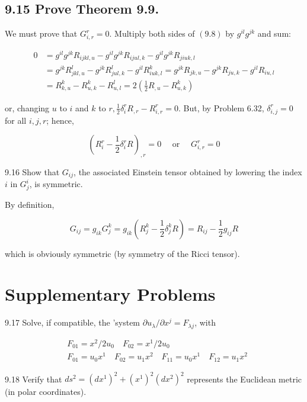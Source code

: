 \documentclass[10pt]{article}
\begin{document}
\subsection*{9.15 Prove Theorem 9.9.}
We must prove that $G_{i, r}^{r}=0$. Multiply both sides of $(9.8)$ by $g^{i l} g^{j k}$ and sum:

$$
\begin{aligned}
0 & =g^{i l} g^{j k} R_{i j k l, u}-g^{i l} g^{j k} R_{i j u l, k}-g^{i l} g^{j k} R_{j i u k, l} \\
& =g^{j k} R_{j k l, u}^{l}-g^{j k} R_{j u l, k}^{l}-g^{i l} R_{i u k, l}^{k}=g^{j k} R_{j k, u}-g^{j k} R_{j u, k}-g^{i l} R_{i u, l} \\
& =R_{k, u}^{k}-R_{u, k}^{k}-R_{u, l}^{l}=2\left(\frac{1}{2} R_{, u}-R_{u, k}^{k}\right)
\end{aligned}
$$

or, changing $u$ to $i$ and $k$ to $r, \frac{1}{2} \delta_{i}^{r} R_{, r}-R_{i, r}^{r}=0$. But, by Problem 6.32, $\delta_{i, j}^{r}=0$ for all $i, j, r$; hence,

$$
\left(R_{i}^{r}-\frac{1}{2} \delta_{i}^{r} R\right)_{, r}=0 \quad \text { or } \quad G_{i, r}^{r}=0
$$

9.16 Show that $G_{i j}$, the associated Einstein tensor obtained by lowering the index $i$ in $G_{j}^{i}$, is symmetric.

By definition,

$$
G_{i j}=g_{i k} G_{j}^{k}=g_{i k}\left(R_{j}^{k}-\frac{1}{2} \delta_{j}^{k} R\right)=R_{i j}-\frac{1}{2} g_{i j} R
$$

which is obviously symmetric (by symmetry of the Ricci tensor).

\section*{Supplementary Problems}
9.17 Solve, if compatible, the 'system $\partial u_{\lambda} / \partial x^{j}=F_{\lambda j}$, with

$$
\begin{aligned}
& F_{01}=x^{2} / 2 u_{0} \quad F_{02}=x^{1} / 2 u_{0} \\
& F_{01}=u_{0} x^{1} \quad F_{02}=u_{1} x^{2} \quad F_{11}=u_{0} x^{1} \quad F_{12}=u_{1} x^{2}
\end{aligned}
$$

9.18 Verify that $d s^{2}=\left(d x^{1}\right)^{2}+\left(x^{1}\right)^{2}\left(d x^{2}\right)^{2}$ represents the Euclidean metric (in polar coordinates).
\end{document}
